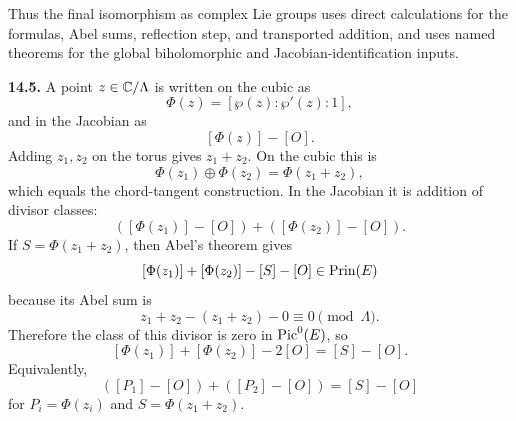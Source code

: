 Thus the final isomorphism as complex Lie groups uses direct calculations for
the formulas, Abel sums, reflection step, and transported addition, and uses
named theorems for the global biholomorphic and Jacobian-identification inputs.

\begin{center}
\end{center}

\textbf{14.5.} A point \(z\in\mathbb{C}/\Lambda\) is written on the cubic as
\[
  \Phi(z)=[\wp(z):\wp'(z):1],
\]
and in the Jacobian as
\[
  [\Phi(z)]-[O].
\]
Adding \(z_1,z_2\) on the torus gives \(z_1+z_2\).  On the cubic this is
\[
  \Phi(z_1)\oplus\Phi(z_2)=\Phi(z_1+z_2),
\]
which equals the chord-tangent construction.  In the Jacobian it is addition of
divisor classes:
\[
  ([\Phi(z_1)]-[O])+([\Phi(z_2)]-[O]).
\]
If \(S=\Phi(z_1+z_2)\), then Abel's theorem gives
\[
  [\Phi(z_1)]+[\Phi(z_2)]-[S]-[O]\in\operatorname{Prin}(E)
\]
because its Abel sum is
\[
  z_1+z_2-(z_1+z_2)-0\equiv0\pmod{\Lambda}.
\]
Therefore the class of this divisor is zero in \(\operatorname{Pic}^0(E)\), so
\[
  [\Phi(z_1)]+[\Phi(z_2)]-2[O]=[S]-[O].
\]
Equivalently,
\[
  ([P_1]-[O])+([P_2]-[O])=[S]-[O]
\]
for \(P_i=\Phi(z_i)\) and \(S=\Phi(z_1+z_2)\).

\begin{center}
\end{center}
